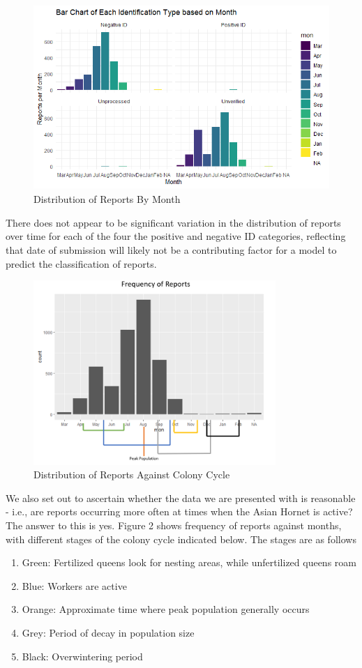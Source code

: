 \documentclass[letterpaper]{article}
\begin{document}
\begin{figure}[H]
\centering\includegraphics[height = 7cm]{compareDistributions.png}
\caption{Distribution of Reports By Month}
\end{figure}
There does not appear to be significant variation in the distribution of reports over time for each of the four the positive and negative ID categories, reflecting that date of submission will likely not be a contributing factor for a model to predict the classification of reports.



\begin{figure}[H]
\centering\includegraphics[height = 7cm]{frequencies_yeehaw.PNG}
\caption{Distribution of Reports Against Colony Cycle}
\end{figure}
We also set out to ascertain whether the data we are presented with is reasonable - i.e., are reports occurring more often at times when the Asian Hornet is active? The answer to this is yes. Figure 2 shows frequency of reports against months, with different stages of the colony cycle indicated below. The stages are as follows
\begin{enumerate}
    \item Green: Fertilized queens look for nesting areas, while unfertilized queens roam
    \item Blue: Workers are active 
    \item Orange: Approximate time where peak population generally occurs
    \item Grey: Period of decay in population size 
    \item Black: Overwintering period
\end{enumerate}
\end{document}
